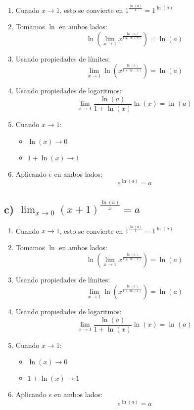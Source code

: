\begin{enumerate}
    \item Cuando $x \to 1$, esto se convierte en $1^{\frac{\ln(a)}{1}} = 1^{\ln(a)}$
    
    \item Tomamos $\ln$ en ambos lados:
    \[\ln(\lim_{x \to 1} x^{\frac{\ln(a)}{1+\ln(x)}}) = \ln(a)\]
    
    \item Usando propiedades de límites:
    \[\lim_{x \to 1} \ln(x^{\frac{\ln(a)}{1+\ln(x)}}) = \ln(a)\]
    
    \item Usando propiedades de logaritmos:
    \[\lim_{x \to 1} \frac{\ln(a)}{1+\ln(x)}\ln(x) = \ln(a)\]
    
    \item Cuando $x \to 1$:
    \begin{itemize}
        \item $\ln(x) \to 0$
        \item $1+\ln(x) \to 1$
    \end{itemize}
    
    \item Aplicando $e$ en ambos lados:
    \[e^{\ln(a)} = a\]
\end{enumerate}

\subsection*{c)  $\lim_{x \to 0} (x + 1)^{\frac{\ln(a)}{x}} = a$}

\begin{enumerate}
    \item Cuando $x \to 1$, esto se convierte en $1^{\frac{\ln(a)}{1}} = 1^{\ln(a)}$
    
    \item Tomamos $\ln$ en ambos lados:
    \[\ln\left(\lim_{x \to 1} x^{\frac{\ln(a)}{1+\ln(x)}}\right) = \ln(a)\]
    
    \item Usando propiedades de límites:
    \[\lim_{x \to 1} \ln\left(x^{\frac{\ln(a)}{1+\ln(x)}}\right) = \ln(a)\]
    
    \item Usando propiedades de logaritmos:
    \[\lim_{x \to 1} \frac{\ln(a)}{1+\ln(x)}\ln(x) = \ln(a)\]
    
    \item Cuando $x \to 1$:
    \begin{itemize}
        \item $\ln(x) \to 0$
        \item $1+\ln(x) \to 1$
    \end{itemize}
    
    \item Aplicando $e$ en ambos lados:
    \[e^{\ln(a)} = a\]
\end{enumerate}
